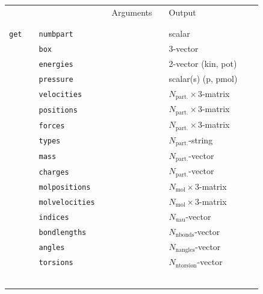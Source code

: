 \documentclass[11pt]{article}
\begin{document}
\begin{center}
  
  \begin{tabular}{cclclclll}
    {\color{red}{\textbf{Action}}} && {\color{blue}{Specifier}} && Arguments && Output \\
                                   && && && \\
    \hline
                                   && && && \\
    \verb!get! && \verb!numbpart!&& && scalar\\
    $\mbox{}$  && \verb!box! && && 3-vector \\
    $\mbox{}$  && \verb!energies! && && 2-vector (kin, pot)\\
    $\mbox{}$  && \verb!pressure! && && scalar(s) (p, pmol) \\
    $\mbox{}$  && \verb!velocities! && && $N_\mathrm{part.}\times 3$-matrix \\
    $\mbox{}$  && \verb!positions! && &&  $N_\mathrm{part.}\times 3$-matrix \\
    $\mbox{}$  && \verb!forces! && &&  $N_\mathrm{part.}\times 3$-matrix \\
    $\mbox{}$  && \verb!types! && && $N_\mathrm{part.}$-string \\
    $\mbox{}$  && \verb!mass! && && $N_\mathrm{part.}$-vector \\
    $\mbox{}$  && \verb!charges! && && $N_\mathrm{part.}$-vector \\
    $\mbox{}$  && \verb!molpositions! && && $N_\mathrm{mol}\times 3$-matrix \\
    $\mbox{}$  && \verb!molvelocities! && && $N_\mathrm{mol}\times 3$-matrix \\
    $\mbox{}$ && \verb!indices! && && $N_\mathrm{uau}$-vector \\
    $\mbox{}$ && \verb!bondlengths! && && $N_\mathrm{nbonds}$-vector \\
    $\mbox{}$ && \verb!angles! && && $N_\mathrm{nangles}$-vector \\
    $\mbox{}$ && \verb!torsions! && && $N_\mathrm{ntorsion}$-vector \\
    $\mbox{}$ && && && \\
    \hline
                                   && && && \\
  \end{tabular}

\end{center}
    
\end{document}
